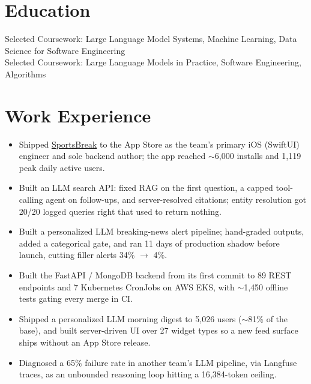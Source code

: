 \documentclass[11pt, letterpaper]{article}
\begin{document}

\section{Education}
Selected Coursework: Large Language Model Systems, Machine Learning, Data Science for Software Engineering\\[1pt]
Selected Coursework: Large Language Models in Practice, Software Engineering, Algorithms

\section{Work Experience}
\begin{itemize}
  \item Shipped \href{https://apps.apple.com/app/id6762649287}{SportsBreak} to the App Store as the team's primary iOS (SwiftUI) engineer and sole backend author; the app reached $\sim$6{,}000 installs and 1{,}119 peak daily active users.
  \item Built an LLM search API: fixed RAG on the first question, a capped tool-calling agent on follow-ups, and server-resolved citations; entity resolution got 20/20 logged queries right that used to return nothing.
  \item Built a personalized LLM breaking-news alert pipeline; hand-graded outputs, added a categorical gate, and ran 11 days of production shadow before launch, cutting filler alerts 34\% $\to$ 4\%.
  \item Built the FastAPI / MongoDB backend from its first commit to 89 REST endpoints and 7 Kubernetes CronJobs on AWS EKS, with $\sim$1{,}450 offline tests gating every merge in CI.
  \item Shipped a personalized LLM morning digest to 5{,}026 users ($\sim$81\% of the base), and built server-driven UI over 27 widget types so a new feed surface ships without an App Store release.
  \item Diagnosed a 65\% failure rate in another team's LLM pipeline, via Langfuse traces, as an unbounded reasoning loop hitting a 16{,}384-token ceiling.
\end{itemize}
\end{document}
